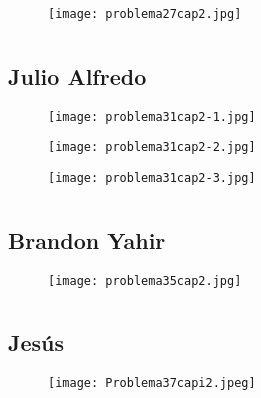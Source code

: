 \documentclass[12pt]{article}
\begin{document}
\begin{figure}[htb] 
\centering \texttt{[image: problema27cap2.jpg]} 
\end{figure}
\newpage

\section{ }
\subsection{{} Julio Alfredo}

\begin{figure}[htb] 
\centering \texttt{[image: problema31cap2-1.jpg]} 
\end{figure}
\newpage

\begin{figure}[htb] 
\centering \texttt{[image: problema31cap2-2.jpg]} 
\end{figure}
\newpage

\begin{figure}[htb] 
\centering \texttt{[image: problema31cap2-3.jpg]} 
\end{figure}
\newpage

\section{ }
\subsection{{} Brandon Yahir}

\begin{figure}[htb] 
\centering \texttt{[image: problema35cap2.jpg]} 
\end{figure}
\newpage

\section{ }
\subsection{{} Jesús}

\begin{figure}[htb] 
\centering \texttt{[image: Problema37capi2.jpeg]} 
\end{figure}
\newpage
\end{document}
